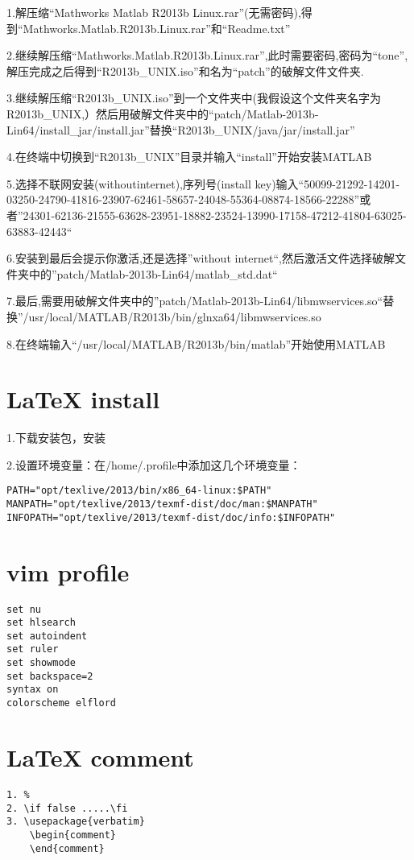 \documentclass{book}
\begin{document}
\begin{CJK}{UTF8}{gbsn}
1.解压缩“Mathworks Matlab R2013b Linux.rar”(无需密码),得
到“Mathworks.Matlab.R2013b.Linux.rar”和“Readme.txt”

2.继续解压缩“Mathworks.Matlab.R2013b.Linux.rar”,此时需要密码,密码为“tone”,解压完成之后得到“R2013b\_UNIX.iso”和名为“patch”的破解文件文件夹.

3.继续解压缩“R2013b\_UNIX.iso”到一个文件夹中(我假设这个文件夹名字为R2013b\_UNIX,）然后用破解文件夹中的“patch/Matlab-2013b-Lin64/install\_jar/install.jar”替换“R2013b\_UNIX/java/jar/install.jar”

4.在终端中切换到“R2013b\_UNIX”目录并输入“install”开始安装MATLAB

5.选择不联网安装(withoutinternet),序列号(install key)输入“50099-21292-14201-03250-24790-41816-23907-62461-58657-24048-55364-08874-18566-22288”或者”24301-62136-21555-63628-23951-18882-23524-13990-17158-47212-41804-63025-63883-42443“

6.安装到最后会提示你激活,还是选择”without internet“,然后激活文件选择破解文件夹中的”patch/Matlab-2013b-Lin64/matlab\_std.dat“

7.最后,需要用破解文件夹中的”patch/Matlab-2013b-Lin64/libmwservices.so“替换”/usr/local/MATLAB/R2013b/bin/glnxa64/libmwservices.so

8.在终端输入“/usr/local/MATLAB/R2013b/bin/matlab”开始使用MATLAB

\newpage

\section{LaTeX install}

1.下载安装包，安装

2.设置环境变量：在/home/.profile中添加这几个环境变量：

\begin{lstlisting}
PATH="opt/texlive/2013/bin/x86_64-linux:$PATH"
MANPATH="opt/texlive/2013/texmf-dist/doc/man:$MANPATH"
INFOPATH="opt/texlive/2013/texmf-dist/doc/info:$INFOPATH"
\end{lstlisting}


\section{vim profile}

\begin{lstlisting}
set nu
set hlsearch
set autoindent
set ruler
set showmode
set backspace=2
syntax on
colorscheme elflord
\end{lstlisting}


\section{LaTeX comment}
\begin{lstlisting}
1. %
2. \if false .....\fi
3. \usepackage{verbatim}
	\begin{comment}
	\end{comment}
\end{lstlisting}

\end{CJK}
\end{document}
